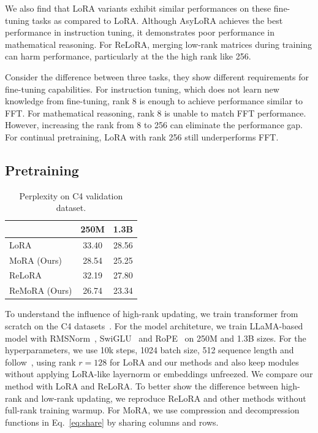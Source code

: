 \documentclass[11pt]{article}
\begin{document}
We also find that LoRA variants exhibit similar performances on these fine-tuning tasks as compared to LoRA. Although AsyLoRA achieves the best performance in instruction tuning, it demonstrates poor performance in mathematical reasoning. For ReLoRA, merging low-rank matrices during training can harm performance, particularly at the the high rank like 256.

Consider the difference between three tasks, they show different requirements for fine-tuning capabilities.
For instruction tuning, which does not learn new knowledge from fine-tuning, rank 8 is enough to achieve performance similar to FFT. For mathematical reasoning, rank 8 is unable to match FFT performance.
However, increasing the rank from 8 to 256 can eliminate the performance gap. For continual pretraining, LoRA with rank 256 still underperforms FFT.



\subsection{Pretraining}
\label{sec:pretraining}

\begin{table}[t]
\centering
\begin{tabular}{lcc}
\toprule
 & 250M & 1.3B \\
\midrule
LoRA & 33.40 & 28.56 \\
MoRA (Ours) & 28.54 & 25.25 \\
ReLoRA & 32.19 & 27.80 \\
ReMoRA (Ours) & 26.74 & 23.34 \\
\bottomrule
\end{tabular}
\caption{Perplexity on C4 validation dataset.
}
\vspace{-10pt}
\label{table:ppl}
\end{table}

To understand the influence of high-rank updating,
we train transformer from scratch on the C4 datasets~\cite{raffel2020exploring}.
For the model architeture, we train LLaMA-based model with RMSNorm~\cite{zhang2019root}, SwiGLU~\cite{shazeer2020glu} and RoPE~\cite{su2024roformer} on 250M and 1.3B sizes.
For the hyperparameters, we use 10k steps, 1024 batch size, 512 sequence length and follow~\citeauthor{lialin2023stack}, using rank $r=128$ for LoRA and our methods and also keep modules without applying LoRA-like layernorm or embeddings unfreezed.
We compare our method with LoRA and ReLoRA.
To better show the difference between high-rank and low-rank updating, we reproduce ReLoRA and other methods without full-rank training warmup.
For MoRA, we use compression and decompression functions in Eq.~\ref{eq:share} by sharing columns and rows.
\end{document}
